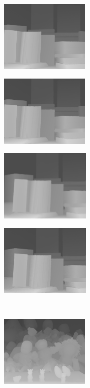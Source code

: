 \documentclass[preprint,10pt,5p,times,twocolumn]{elsarticle}
\begin{document}
\begin{figure}
\centering
\begin{subfigure}[b]{0.24\textwidth}
\includegraphics[height= 3.5cm, width=\textwidth]{fig_books.png}
\end{subfigure}
\begin{subfigure}[b]{0.24\textwidth}
\includegraphics[height= 3.5cm, width=\textwidth]{fig_books_8X_lqdai.png}
\end{subfigure}
\begin{subfigure}[b]{0.24\textwidth}
\includegraphics[height= 3.5cm, width=\textwidth]{fig_books_8X_cvpr.png}
\end{subfigure}
\begin{subfigure}[b]{0.24\textwidth}
\includegraphics[height= 3.5cm, width=\textwidth]{fig_books_8X_iccv.png}
\end{subfigure}
\\ \vspace{0.1cm}
\begin{subfigure}[b]{0.24\textwidth}
\includegraphics[height= 3.5cm, width=\textwidth]{fig_dolls.png}

\end{subfigure}
\end{figure}
\end{document}

